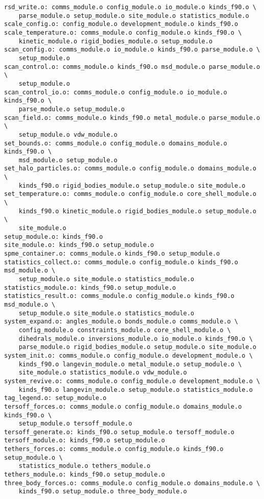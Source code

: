 \begin{verbatim}
rsd_write.o: comms_module.o config_module.o io_module.o kinds_f90.o \
	parse_module.o setup_module.o site_module.o statistics_module.o
scale_config.o: config_module.o development_module.o kinds_f90.o
scale_temperature.o: comms_module.o config_module.o kinds_f90.o \
	kinetic_module.o rigid_bodies_module.o setup_module.o
scan_config.o: comms_module.o io_module.o kinds_f90.o parse_module.o \
	setup_module.o
scan_control.o: comms_module.o kinds_f90.o msd_module.o parse_module.o \
	setup_module.o
scan_control_io.o: comms_module.o config_module.o io_module.o kinds_f90.o \
	parse_module.o setup_module.o
scan_field.o: comms_module.o kinds_f90.o metal_module.o parse_module.o \
	setup_module.o vdw_module.o
set_bounds.o: comms_module.o config_module.o domains_module.o kinds_f90.o \
	msd_module.o setup_module.o
set_halo_particles.o: comms_module.o config_module.o domains_module.o \
	kinds_f90.o rigid_bodies_module.o setup_module.o site_module.o
set_temperature.o: comms_module.o config_module.o core_shell_module.o \
	kinds_f90.o kinetic_module.o rigid_bodies_module.o setup_module.o \
	site_module.o
setup_module.o: kinds_f90.o
site_module.o: kinds_f90.o setup_module.o
spme_container.o: comms_module.o kinds_f90.o setup_module.o
statistics_collect.o: comms_module.o config_module.o kinds_f90.o msd_module.o \
	setup_module.o site_module.o statistics_module.o
statistics_module.o: kinds_f90.o setup_module.o
statistics_result.o: comms_module.o config_module.o kinds_f90.o msd_module.o \
	setup_module.o site_module.o statistics_module.o
system_expand.o: angles_module.o bonds_module.o comms_module.o \
	config_module.o constraints_module.o core_shell_module.o \
	dihedrals_module.o inversions_module.o io_module.o kinds_f90.o \
	parse_module.o rigid_bodies_module.o setup_module.o site_module.o
system_init.o: comms_module.o config_module.o development_module.o \
	kinds_f90.o langevin_module.o metal_module.o setup_module.o \
	site_module.o statistics_module.o vdw_module.o
system_revive.o: comms_module.o config_module.o development_module.o \
	kinds_f90.o langevin_module.o setup_module.o statistics_module.o
tag_legend.o: setup_module.o
tersoff_forces.o: comms_module.o config_module.o domains_module.o kinds_f90.o \
	setup_module.o tersoff_module.o
tersoff_generate.o: kinds_f90.o setup_module.o tersoff_module.o
tersoff_module.o: kinds_f90.o setup_module.o
tethers_forces.o: comms_module.o config_module.o kinds_f90.o setup_module.o \
	statistics_module.o tethers_module.o
tethers_module.o: kinds_f90.o setup_module.o
three_body_forces.o: comms_module.o config_module.o domains_module.o \
	kinds_f90.o setup_module.o three_body_module.o

\end{verbatim}
